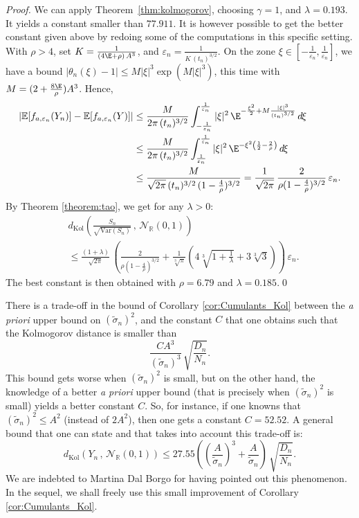 \documentclass[envcountsame]{svmult}
\newcommand{\R}{\mathbb{R}}
\newcommand{\esper}{\mathbb{E}}
\newcommand{\dkol}{d_\mathrm{Kol}}
\newcommand{\eps}{\varepsilon}
\newcommand{\var}{\mathrm{Var}}
\newcommand{\gauss}{\mathcal{N}_{\R}(0,1)}
\newcommand{\DD}[1]{\,d\hspace*{-0.3mm}{#1}}
\begin{document}
\begin{proof}
We can apply Theorem~\ref{thm:kolmogorov}, choosing $\gamma=1$, and $\lambda=0.193$. It yields a constant smaller than $77.911$.
It is however possible to get the better constant given above by redoing some of the computations in this specific setting. With $\rho>4$, set $K=\frac{1}{(4\E+\rho)\,A^3}$, and $\eps_n = \frac{1}{K\,(t_n)^{3/2}}$. On the zone $\xi \in [-\frac{1}{\eps_n},\frac{1}{\eps_n}]$, we have a bound $|\theta_n(\xi)-1|\leq M|\xi|^3\exp(M|\xi|^3)$, this time with $M = (2 + \frac{8\E}{\rho})A^3$. Hence, 
\begin{align*}
|\esper[f_{a,\eps_n}(Y_n)] - \esper[f_{a,\eps_n}(Y)]| &\leq \frac{M}{2\pi\,(t_n)^{3/2}}\int_{-\frac{1}{\eps_n}}^{\frac{1}{\eps_n}}  |\xi|^{2}\,\E^{-\frac{\xi^2}{2}+ M \frac{|\xi|^3}{(t_n)^{3/2}}}\DD{\xi} \\
&\leq \frac{M}{2\pi\,(t_n)^{3/2}}\int_{\frac{1}{\eps_n}}^{\frac{1}{\eps_n}}  |\xi|^{2}\,\E^{-\xi^2\left(\frac{1}{2}-\frac{2}{\rho}\right)}\DD{\xi} 
\\ 
&\leq \frac{M}{\sqrt{2\pi}\,(t_n)^{3/2}\,(1-\frac{4}{\rho})^{3/2}}  =\frac{1}{\sqrt{2\pi}}\,\frac{2}{\rho(1-\frac{4}{\rho})^{3/2}}\,\eps_n.
\end{align*}
By Theorem \ref{theorem:tao}, we get for any $\lambda > 0$:
\begin{align*}
&\dkol\left(\frac{S_n}{\sqrt{\var(S_n)}}\,,\,\gauss\right) \\
&\leq \frac{(1+\lambda)}{\sqrt{2\pi}}\,\left(\frac{2}{\rho(1-\frac{4}{\rho})^{3/2}}+\frac{1}{\sqrt[3]{\pi}}\left(4\sqrt[3]{1+\frac{1}{\lambda}}+3\sqrt[3]{3}\right)\right)\,\eps_n.
\end{align*}
The best constant is then obtained with $\rho=6.79$ and $\lambda=0.185$.\qed
\end{proof}

\begin{remark}
There is a trade-off in the bound of Corollary \ref{cor:Cumulants_Kol} between the \emph{a priori} upper bound on $(\widetilde{\sigma}_n)^2$, and the constant $C$ that one obtains such that the Kolmogorov distance is smaller than $$\frac{CA^3}{(\widetilde{\sigma}_n)^3}\,\sqrt{\frac{D_n}{N_n}}.$$ 
This bound gets worse when $(\widetilde{\sigma}_n)^2$ is small, but on the other hand, the knowledge of a better \emph{a priori} upper bound (that is precisely when $(\widetilde{\sigma}_n)^2$ is small) yields a better constant $C$. So, for instance, if one knowns that $(\widetilde{\sigma}_n)^2\leq A^2$ (instead of $2A^2$), then one gets a constant $C=52.52$. A general bound that one can state and that takes into account this trade-off is:
$$\dkol(Y_n\,,\,\gauss) \leq 27.55 \left(\left(\frac{A}{\widetilde{\sigma}_n}\right)^3 + \frac{A}{\widetilde{\sigma}_n}\right)\,\sqrt{\frac{D_n}{N_n}}.$$
We are indebted to Martina Dal Borgo for having pointed out this phenomenon. In the sequel, we shall freely use this small improvement of Corollary \ref{cor:Cumulants_Kol}.
\end{remark}
\medskip
\end{document}
